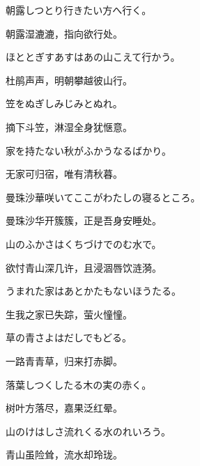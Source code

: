\begin{haiku}
    {\FH 朝露しつとり行きたい方へ行く。}

    {\FK 朝露湿漉漉，指向欲行处。}
\end{haiku}

\begin{haiku}
    {\FH ほととぎすあすはあの山こえて行かう。}

    {\FK 杜鹃声声，明朝攀越彼山行。}
\end{haiku}

\begin{haiku}
    {\FH 笠をぬぎしみじみとぬれ。}

    {\FK 摘下斗笠，淋湿全身犹惬意。}
\end{haiku}

\begin{haiku}
    {\FH 家を持たない秋がふかうなるばかり。}

    {\FK 无家可归宿，唯有清秋暮。}
\end{haiku}

\begin{haiku}
    {\FH 曼珠沙華咲いてここがわたしの寝るところ。}

    {\FK 曼珠沙华开簇簇，正是吾身安睡处。}
\end{haiku}

\begin{haiku}
    {\FH 山のふかさはくちづけでのむ水で。}

    {\FK 欲忖青山深几许，且浸涸唇饮涟漪。}
\end{haiku}

\begin{haiku}
    {\FH うまれた家はあとかたもないほうたる。}

    {\FK 生我之家已失踪，萤火憧憧。}
\end{haiku}

\begin{haiku}
    {\FH 草の青さよはだしでもどる。}

    {\FK 一路青青草，归来打赤脚。}
\end{haiku}

\begin{haiku}
    {\FH 落葉しつくしたる木の実の赤く。}

    {\FK 树叶方落尽，嘉果泛红晕。}
\end{haiku}

\begin{haiku}
    {\FH 山のけはしさ流れくる水のれいろう。}

    {\FK 青山虽险耸，流水却玲珑。}
\end{haiku}

